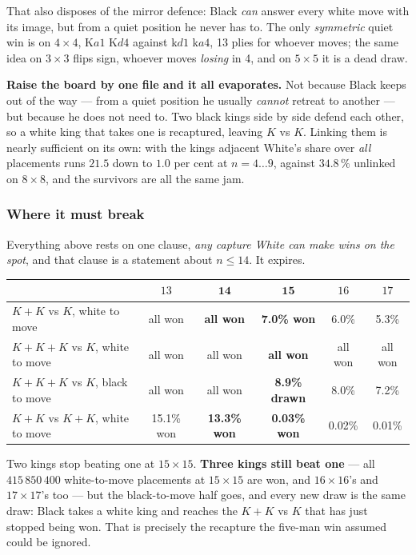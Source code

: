 \documentclass[10pt]{article}
\begin{document}
\medskip
\noindent
That also disposes of the mirror defence: Black \emph{can} answer every white
move with its image, but from a quiet position he never has to. The only
\emph{symmetric} quiet win is on $4\times4$, K$a1$ K$d4$ against k$d1$ k$a4$,
13 plies for whoever moves; the same idea on $3\times3$ flips sign, whoever
moves \emph{losing} in 4, and on $5\times5$ it is a dead draw.

\medskip
\noindent
\textbf{Raise the board by one file and it all evaporates.} Not because Black
keeps out of the way --- from a quiet position he usually \emph{cannot} retreat
to another --- but because he does not need to. Two black kings side by side
defend each other, so a white king that takes one is recaptured, leaving $K$ vs
$K$. Linking them is nearly sufficient on its own: with the kings adjacent
White's share over \emph{all} placements runs $21.5$ down to $1.0$ per cent at
$n=4\ldots9$, against $34.8\,\%$ unlinked on $8\times8$, and the survivors are
all the same jam.

\subsubsection{Where it must break}\label{sub:kings-break}

\noindent
Everything above rests on one clause, \emph{any capture White can make wins on
the spot}, and that clause is a statement about $n\le14$. It expires.

\begin{center}\small
\begin{tabular}{lccccc}
\toprule
 & $13$ & $\mathbf{14}$ & $\mathbf{15}$ & $16$ & $17$\\
\midrule
$K\!+\!K$ vs $K$, white to move        & all won & \textbf{all won} & \textbf{7.0\% won} & 6.0\% & 5.3\%\\
$K\!+\!K\!+\!K$ vs $K$, white to move  & all won & all won & \textbf{all won} & all won & all won\\
$K\!+\!K\!+\!K$ vs $K$, black to move  & all won & all won & \textbf{8.9\% drawn} & 8.0\% & 7.2\%\\
$K\!+\!K$ vs $K\!+\!K$, white to move   & 15.1\% won & \textbf{13.3\% won} & \textbf{0.03\% won} & 0.02\% & 0.01\%\\
\bottomrule
\end{tabular}
\end{center}

\noindent
Two kings stop beating one at $15\times15$. \textbf{Three kings still beat
one} --- all $415\,850\,400$ white-to-move placements at $15\times15$ are won,
and $16\times16$'s and $17\times17$'s too --- but the black-to-move half goes,
and every new draw is the same draw: Black takes a white king and reaches the
$K\!+\!K$ vs $K$ that has just stopped being won. That is precisely the
recapture the five-man win assumed could be ignored.
\end{document}

